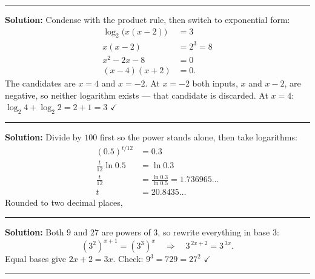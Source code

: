\documentclass[12pt]{article}
\begin{document}
\vspace{0.2cm}\noindent\rule{\linewidth}{0.2pt}\vspace{0.2cm}


\textbf{Solution:} Condense with the product rule, then switch to exponential
form:
\begin{align*}
  \log_2\bigl(x(x-2)\bigr) &= 3 \\
  x(x-2) &= 2^3 = 8 \\
  x^2 - 2x - 8 &= 0 \\
  (x-4)(x+2) &= 0 .
\end{align*}
The candidates are $x = 4$ and $x = -2$. At $x = -2$ both inputs, $x$ and
$x - 2$, are negative, so neither logarithm exists --- that candidate is
discarded. At $x = 4$: $\log_2 4 + \log_2 2 = 2 + 1 = 3$ $\checkmark$

\vspace{0.2cm}\noindent\rule{\linewidth}{0.2pt}\vspace{0.2cm}


\textbf{Solution:} Divide by $100$ first so the power stands alone, then take
logarithms:
\begin{align*}
  (0.5)^{t/12} &= 0.3 \\
  \frac{t}{12}\ln 0.5 &= \ln 0.3 \\
  \frac{t}{12} &= \frac{\ln 0.3}{\ln 0.5} = 1.736965\ldots \\
  t &= 20.8435\ldots
\end{align*}
Rounded to two decimal places, 

\vspace{0.2cm}\noindent\rule{\linewidth}{0.2pt}\vspace{0.2cm}


\textbf{Solution:} Both $9$ and $27$ are powers of $3$, so rewrite everything in
base $3$:
\[ \left(3^2\right)^{x+1} = \left(3^3\right)^{x}
   \quad\Longrightarrow\quad 3^{\,2x+2} = 3^{\,3x} . \]
Equal bases give $2x + 2 = 3x$. Check: $9^3 = 729 = 27^2$ $\checkmark$

\vspace{0.2cm}\noindent\rule{\linewidth}{0.2pt}\vspace{0.2cm}

\end{document}
